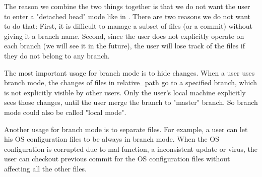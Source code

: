 The reason we combine the two things together is that we do not want the
user to enter a "detached head" mode like in \git\cite{git}. There are two reasons we do not want to do that: First, it is
difficult to manage a subset of files (or a commit) without giving it a branch
name. Second, since the user does not explicitly operate on each branch (we will
see it in the future), the user will lose track of the files if they do not
belong to any branch.

The most important usage for branch mode is to hide changes. When a user
uses branch mode, the changes of files in relative\_path go to a specified
branch, which is not explicitly visible by other users. Only the user's local
machine explicitly sees those changes, until the user merge the branch to
"master" branch. So branch mode could also be called "local mode".

Another usage for branch mode is to separate files. For example, a user can
let his OS configuration files to be always in branch mode. When the OS
configuration is corrupted due to mal-function, a inconsistent update or virus,
the user can checkout previous commit for the OS configuration files without
affecting all the other files.


\iffalse
We described this in the previous section.
\subsection{Trace Level and Automatic Commit}
\hw{Mention trace level and automatic commit stuff if we have space. This
subsection should be relatively short. This is unimportant.}
\fi

